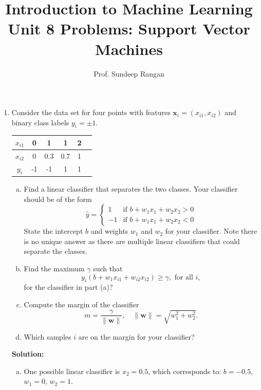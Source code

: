 \documentclass[11pt]{article}
\newcommand{\wbf}{\mathbf{w}}
\newcommand{\xbf}{\mathbf{x}}
\begin{document}
\title{Introduction to Machine Learning\\
Unit 8 Problems:  Support Vector Machines}
\author{Prof. Sundeep Rangan}
\date{}

\maketitle

\begin{enumerate}

\item Consider the data set for four points with
features $\xbf_i=(x_{i1},x_{i2})$ and binary class
labels $y_i=\pm 1$.

\begin{center}
\begin{tabular}{|c|c|c|c|c|c|} \hline
$x_{i1}$ & 0 & 1 & 1 & 2 \\ \hline
$x_{i2}$ & 0 & 0.3 & 0.7 & 1 \\ \hline
$y_i$ & -1 & -1 & 1 & 1 \\ \hline
\end{tabular}
\end{center}

\begin{enumerate}[(a)]
\item Find a linear classifier that separates the two classes.
Your classifier should be of the form
\[
    \hat{y} = \begin{cases}
        1 & \mbox{if } b + w_1 x_1 + w_2 x_2 > 0 \\
        -1 & \mbox{if } b + w_1 x_1 + w_2 x_2 < 0
    \end{cases}
\]
State the intercept $b$ and weights $w_1$ and $w_2$ for your classifier.
Note there is no unique answer as there are multiple linear classifiers
that could separate the classes.

\item Find the maximum $\gamma$ such that
\[
    y_i(b+w_1x_{i1} + w_{i2}x_{i2}) \geq \gamma, \mbox{ for all } i,
\]
for the classifier in part (a)?

\item Compute the margin of the classifier
\[
    m = \frac{\gamma}{\|\wbf\|}, \quad \|\wbf\|= \sqrt{ w_1^2 + w_2^2 }.
\]

\item Which samples $i$ are on the margin for your classifier?
\end{enumerate}

\textbf{Solution:}
\begin{enumerate}[(a)]
\item One possible linear classifier is $x_2 = 0.5$, which corresponds to:
$b = -0.5$, $w_1 = 0$, $w_2 = 1$.


\end{enumerate}
\end{enumerate}
\end{document}
